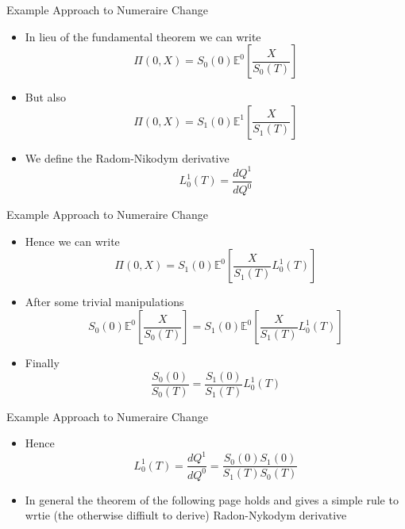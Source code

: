 \documentclass{beamer}
\begin{document}
\begin{frame}{Example Approach to Numeraire Change}
\begin{itemize}
	\item In lieu of the fundamental theorem we can write
	\begin{equation}
	\Pi(0,X)=S_0(0)\mathbb{E}^0\left[\frac{X}{S_0(T)}\right]
	\end{equation}
	\item But also
	\begin{equation}
	\Pi(0,X)=S_1(0)\mathbb{E}^1\left[\frac{X}{S_1(T)}\right]
	\end{equation}
	\item We define the Radom-Nikodym derivative
	\begin{equation}
	L_0^1(T)=\frac{dQ^1}{dQ^0}
	\end{equation}
\end{itemize}
\end{frame}

\begin{frame}{Example Approach to Numeraire Change}
	\begin{itemize}
		\item Hence we can write
		\begin{equation}
			\Pi(0,X)=S_1(0)\mathbb{E}^0\left[\frac{X}{S_1(T)}L_0^1(T)\right]
		\end{equation}
		\item After some trivial manipulations
		\begin{equation}
			S_0(0)\mathbb{E}^0\left[\frac{X}{S_0(T)}\right]=
			S_1(0)\mathbb{E}^0\left[\frac{X}{S_1(T)}L_0^1(T)\right]
		\end{equation}
		\item Finally
		\begin{equation}
			\frac{S_0(0)}{S_0(T)}=\frac{S_1(0)}{S_1(T)}L_0^1(T)		
		\end{equation}
	\end{itemize}
\end{frame}

\begin{frame}{Example Approach to Numeraire Change}
	\begin{itemize}
		\item Hence 
		\begin{equation}
			L_0^1(T) = \frac{dQ^1}{dQ^0}=			\frac{S_0(0)S_1(0)}{S_1(T)S_0(T)}
		\end{equation}
	\item In general the theorem of the following page holds and gives a simple rule to wrtie (the otherwise diffiult to derive) Radon-Nykodym derivative
	\end{itemize}
\end{frame}
\end{document}
